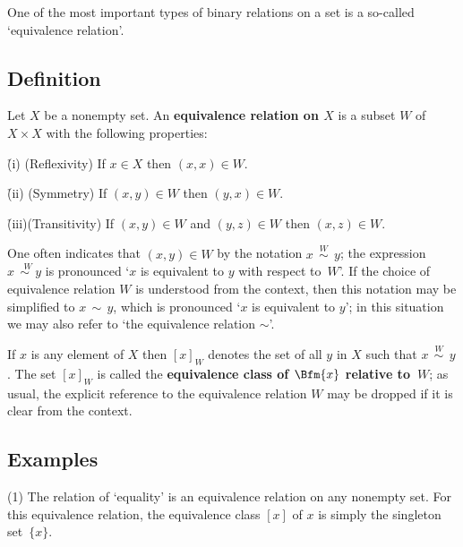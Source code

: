 \V
\V

        One of the most important types of binary relations on a set is a so-called `equivalence relation'.

\V


        \subsection{\small{{\bf Definition}}}
        \label{DefA50.90}

        Let $X$ be a nonempty set.
    An {\bf equivalence relation on $X$} is a subset $W$ of $X{\times}X$ with the following properties:

        \h (i) (Reflexivity) If $x{\in}X$ then $(x,x){\in}W$.

\V

        \h (ii) (Symmetry) If $(x,y){\in}W$ then $(y,x){\in}W$.

\V

        \h (iii)(Transitivity) If $(x,y){\in}W$ and $(y,z){\in}W$ then $(x,z){\in}W$.

\V

        One often indicates that $(x,y){\in}W$ by the notation $x \stackrel{W}{\,\sim\,}y$;
    the expression  $x\stackrel{W}{\,\sim\,y}$ is pronounced `$x$ is equivalent to $y$ with respect to~$W$'.
    If the choice of equivalence relation $W$ is understood from the context, then this notation may be simplified to $x\,{\sim}\,y$,
    which is pronounced `$x$ is equivalent to $y$'; in this situation we may also refer to `the equivalence relation ${\sim}$'.

        If $x$ is any element of $X$ then $[x]_{W}$ denotes the set of all $y$ in $X$ such that $x \stackrel{W}{\,\sim\,}y$.
    The set $[x]_{W}$ is called the {\bf equivalence class of $\Bfm{x}$ relative to~$W$};
    as usual, the explicit reference to the equivalence relation $W$ may be dropped if it is clear from the context.


        \subsection{\small{{\bf Examples}}}
        \label{ExampA50.100}

\hspace*{\parindent}
        (1) The relation of `equality' is an equivalence relation on any nonempty set.
    For this equivalence relation, the equivalence class $[x]$ of $x$ is simply the singleton set~$\{x\}$.

